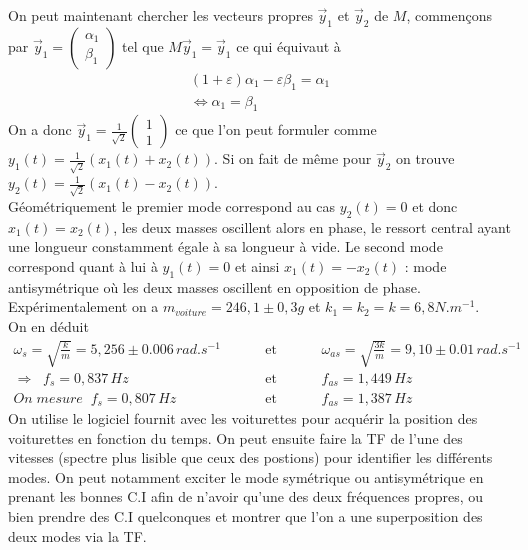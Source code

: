 \documentclass[12pt,prb,aps,epsf]{article}
\begin{document}
On peut maintenant chercher les vecteurs propres $\vec{y}_1$ et $\vec{y}_2$ de $M$, commençons par $\vec{y}_1 = \begin{pmatrix}
\alpha_1\\ \beta_1
\end{pmatrix}$ tel que $M\vec{y}_1 = \vec{y}_1$ ce qui équivaut à
\begin{eqnarray}
(1+\varepsilon)\alpha_1 - \varepsilon \beta_1 = \alpha_1\\
\Leftrightarrow \alpha_1 = \beta_1
\end{eqnarray}
On a donc $\vec{y}_1 = \frac{1}{\sqrt{2}}\begin{pmatrix}
1\\ 1
\end{pmatrix}$ ce que l'on peut formuler comme $y_1(t) = \frac{1}{\sqrt{2}}(x_1(t) + x_2(t))$. Si on fait de même pour $\vec{y}_2$ on trouve $y_2(t) = \frac{1}{\sqrt{2}}(x_1(t) - x_2(t))$.\\ Géométriquement le premier mode correspond au cas $y_2(t)=0$ et donc $x_1(t) = x_2(t)$, les deux masses oscillent alors en phase, le ressort central ayant une longueur constamment égale à sa longueur à vide. Le second mode correspond quant à lui à $y_1(t) = 0$ et ainsi $x_1(t) = -x_2(t)$ : mode antisymétrique où les deux masses oscillent en opposition de phase.\\

Expérimentalement on a 
$m_{voiture} = 246,1\pm0,3g$ et $k_1=k_2=k = 6,8 N.m^{-1}$.\\
On en déduit 
\begin{eqnarray}
\omega_{s} = \sqrt{\frac{k}{m}} = 5,256\pm0.006\,rad.s^{-1} \hspace{1cm}&\mathrm{et}&\hspace{1cm}\omega_{as} = \sqrt{\frac{3k}{m}} = 9,10\pm0.01 \,rad.s^{-1}\\
\Rightarrow\;\;f_{s} = 0,837 \,Hz \hspace{1cm}&\mathrm{et}&\hspace{1cm} f_{as} = 1,449\,Hz\\
On\;mesure\;\;f_{s} = 0,807 \,Hz \hspace{1cm}&\mathrm{et}&\hspace{1cm} f_{as} = 1,387\,Hz
\end{eqnarray}
On utilise le logiciel fournit avec les voiturettes pour acquérir la position des voiturettes en fonction du temps. On peut ensuite faire la TF de l'une des vitesses (spectre plus lisible que ceux des postions) pour identifier les différents modes. On peut notamment exciter le mode symétrique ou antisymétrique en prenant les bonnes C.I afin de n'avoir qu'une des deux fréquences propres, ou bien prendre des C.I quelconques et montrer que l'on a une superposition des deux modes via la TF.\\
\end{document}
